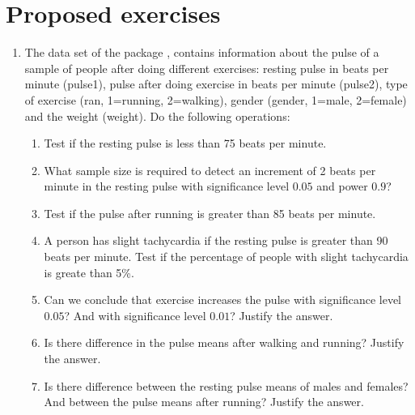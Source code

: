 \section{Proposed exercises}
\begin{enumerate}[leftmargin=*] 
\item The data set  of the package , contains information about the pulse of a
sample of people after doing different exercises: resting pulse in beats per minute (pulse1), pulse after doing
exercise in beats per minute (pulse2), type of exercise (ran, 1=running, 2=walking), gender (gender, 1=male, 2=female)
and the weight (weight).
Do the following operations:
\begin{enumerate}
\item Test if the resting pulse is less than 75 beats per minute.
\item What sample size is required to detect an increment of 2 beats per minute in the resting pulse with
significance level $0.05$ and power $0.9$?
\item Test if the pulse after running is greater than 85 beats per minute.
\item A person has slight tachycardia if the resting pulse is greater than 90 beats per minute.
Test if the percentage of people with slight tachycardia is greate than 5\%.
\item Can we conclude that exercise increases the pulse with significance level $0.05$?
And with significance level $0.01$?
Justify the answer.
\item Is there difference in the pulse means after walking and running?
Justify the answer.
\item Is there difference between the resting pulse means of males and females?
And between the pulse means after running?
Justify the answer.
\end{enumerate}

\end {enumerate}
